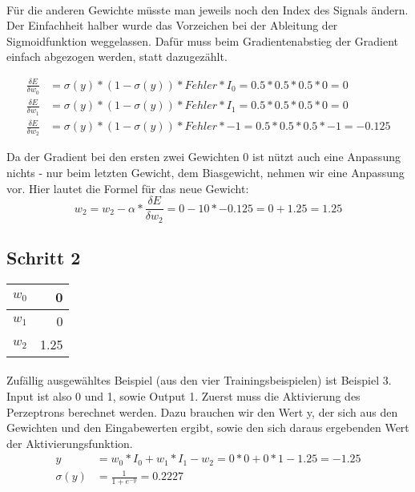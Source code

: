 \documentclass[a4paper]{article}
\begin{document}
\paragraph{}
Für die anderen Gewichte müsste man jeweils noch den Index des Signals ändern.
Der Einfachheit halber wurde das Vorzeichen bei der Ableitung der Sigmoidfunktion weggelassen. Dafür muss beim Gradientenabstieg der Gradient einfach abgezogen werden, statt dazugezählt.

\begin{align*}
	\frac{\delta E}{\delta w_0} &= \sigma(y) * (1 - \sigma(y)) * Fehler * I_0 = 0.5 * 0.5 * 0.5 * 0 = 0 \\
	\frac{\delta E}{\delta w_1} &= \sigma(y) * (1 - \sigma(y)) * Fehler * I_1 = 0.5 * 0.5 * 0.5 * 0 = 0 \\
	\frac{\delta E}{\delta w_2} &= \sigma(y) * (1 - \sigma(y)) * Fehler * -1 = 0.5 * 0.5 * 0.5 * -1 = -0.125
\end{align*}

Da der Gradient bei den ersten zwei Gewichten 0 ist nützt auch eine Anpassung nichts - nur beim letzten Gewicht, dem Biasgewicht, nehmen wir eine Anpassung vor. Hier lautet die Formel für das neue Gewicht:
\[
	w_2 = w_2 - \alpha * \frac{\delta E}{\delta w_2} = 0 - 10 * -0.125 = 0 + 1.25 = 1.25
\]

\subsection{Schritt 2}
\begin{tabular}{|l|r|}
	\hline
	$w_0$ & 0 \\\hline
	$w_1$ & 0 \\\hline
	$w_2$ & 1.25 \\\hline
\end{tabular}
\paragraph{}
Zufällig ausgewähltes Beispiel (aus den vier Trainingsbeispielen) ist Beispiel 3. Input ist also 0 und 1, sowie Output 1.
Zuerst muss die Aktivierung des Perzeptrons berechnet werden. Dazu brauchen wir den Wert y, der sich aus den Gewichten und den Eingabewerten ergibt, sowie den sich daraus ergebenden Wert der Aktivierungsfunktion.
\begin{align*}
	y &= w_0 * I_0 + w_1 * I_1 - w_2 = 0 * 0 + 0 * 1 - 1.25 = -1.25 \\
	\sigma(y) &= \frac{1}{1 + e^{-y}} = 0.2227
\end{align*}
\end{document}
